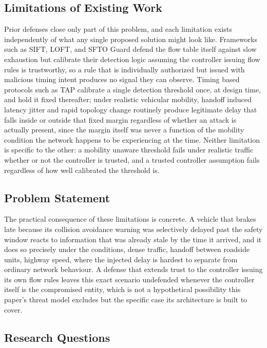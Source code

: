 \documentclass[final,5p,twocolumn]{elsarticle}
\theoremstyle{remark}
\theoremstyle{plain}
\begin{document}
\subsection{Limitations of Existing Work}

Prior defenses close only part of this problem, and each limitation
exists independently of what any single proposed solution might look
like. Frameworks such as SIFT, LOFT, and SFTO Guard defend the flow table
itself against slow exhaustion but calibrate their detection logic
assuming the controller issuing flow rules is trustworthy, so a rule that
is individually authorized but issued with malicious timing intent
produces no signal they can observe. Timing based protocols such as TAP
calibrate a single detection threshold once, at design time, and hold it
fixed thereafter; under realistic vehicular mobility, handoff induced
latency jitter and rapid topology change routinely produce legitimate
delay that falls inside or outside that fixed margin regardless of
whether an attack is actually present, since the margin itself was never
a function of the mobility condition the network happens to be
experiencing at the time. Neither limitation is specific to the other:
a mobility unaware threshold fails under realistic traffic whether or not
the controller is trusted, and a trusted controller assumption fails
regardless of how well calibrated the threshold is.

\subsection{Problem Statement}

The practical consequence of these limitations is concrete. A vehicle
that brakes late because its collision avoidance warning was selectively
delayed past the safety window reacts to information that was already
stale by the time it arrived, and it does so precisely under the
conditions, dense traffic, handoff between roadside units, highway speed,
where the injected delay is hardest to separate from ordinary network
behaviour. A defense that extends trust to the controller issuing its own
flow rules leaves this exact scenario undefended whenever the controller
itself is the compromised entity, which is not a hypothetical possibility
this paper's threat model excludes but the specific case its architecture
is built to cover.

\subsection{Research Questions}
\end{document}
